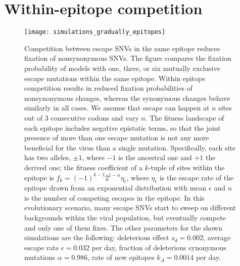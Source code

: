 \newpage
\section{Within-epitope competition}
\begin{figure}[h]
\begin{center}
\texttt{[image: simulations\_gradually\_epitopes]}
\caption{
Competition between escape SNVs in the same epitope reduces fixation of
nonsynonymous SNVs. The figure compares the fixation probability of models
with one, three, or six mutually exclusive escape mutations within the
same epitope. Within epitope competition results in reduced fixation
probabilities of nonsynonymous changes, whereas the synonymous changes behave 
similarly in all cases. We assume that escape can happen at $n$ sites out of 3
consecutive codons and vary $n$.
The fitness landscape of each epitope includes negative epistatic terms, so that
the joint presence of more than one escape mutation is not any more beneficial
for the virus than a single mutation. Specifically, each site has two alleles,
$\pm 1$, where $-1$ is the ancestral one and $+1$ the derived one; the fitness
coefficient of a $k$-tuple of sites within the epitope is $f_k = (-1)^{k-1}
2^{1-n}\eta_\epsilon $, where $\eta_\epsilon$ is the escape rate of the epitope
drawn from an exponential distribution with mean $\epsilon$ and 
$n$ is the number of competing escapes in the epitope. 
In this evolutionary scenario, many escape SNVs start to sweep on different backgrounds within the viral population, but eventually
compete and only one of them fixes. The other parameters for the shown simulations are
the following: deleterious effect $s_d = 0.002$, average escape rate
$\epsilon = 0.032$ per day, fraction of deleterious synonymous mutations $\alpha = 0.986$, rate of new epitopes
$k_A=0.0014$ per day.
}
\label{fig:wec}
\end{center}
\end{figure}

